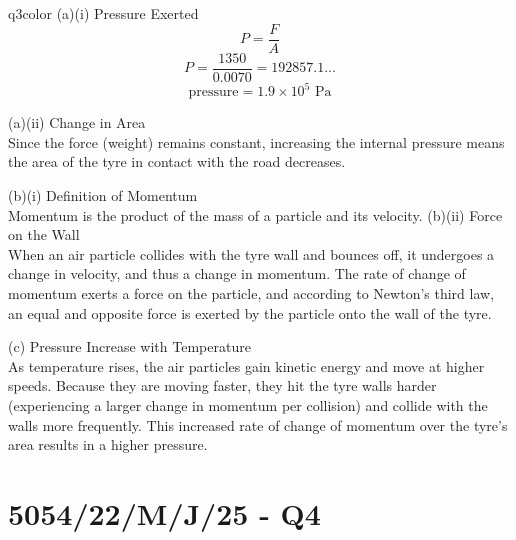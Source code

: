 \documentclass[11pt,a4paper]{article}
\newcommand{\qsection}[1]{\needspace{10\baselineskip}\section*{#1}}
\begin{document}
\begin{ansbox}{q3color}
(a)(i) Pressure Exerted\\[4pt]
\[ P = \frac{F}{A} \]
\[ P = \frac{1350}{0.0070} = 192857.1 \dots \]
\[ \text{pressure} = \boxed{1.9 \times 10^5 \text{ Pa}} \]

\vspace{4pt}
(a)(ii) Change in Area\\[4pt]
Since the force (weight) remains constant, increasing the internal pressure means the area of the tyre in contact with the road decreases.

\vspace{4pt}
(b)(i) Definition of Momentum\\[4pt]
Momentum is the product of the mass of a particle and its velocity.
\clearpage
\vspace{4pt}
(b)(ii) Force on the Wall\\[4pt]
When an air particle collides with the tyre wall and bounces off, it undergoes a change in velocity, and thus a change in momentum. The rate of change of momentum exerts a force on the particle, and according to Newton's third law, an equal and opposite force is exerted by the particle onto the wall of the tyre.

\vspace{4pt}
(c) Pressure Increase with Temperature\\[4pt]
As temperature rises, the air particles gain kinetic energy and move at higher speeds. Because they are moving faster, they hit the tyre walls harder (experiencing a larger change in momentum per collision) and collide with the walls more frequently. This increased rate of change of momentum over the tyre's area results in a higher pressure.
\end{ansbox}

\qsection{5054/22/M/J/25 - Q4}\label{p2_mj25:q4}
\end{document}
